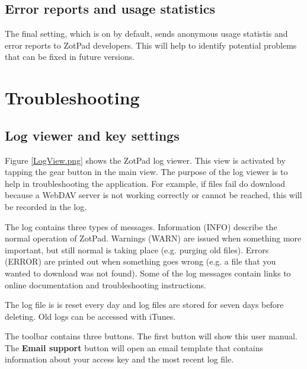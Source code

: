 \documentclass[oneside, openany, 12pt]{tufte-book}
\newcommand{\iphone}[1]{#1}
\newcommand{\ipad}[1]{}
\newcommand{\image}[2]{
	\center
	\fbox{\texttt{[image: images/iPhone/\{\#2]}}}

	\refstepcounter{figure}
	\smallskip\noindent\small Figure \thefigure: #1
	\label{#2}
	}
\newcommand{\iphone}[1]{}
\newcommand{\ipad}[1]{#1}
\newcommand{\image}[2]{
	\caption{#1}
	\label{#2}
	\fbox{\texttt{[image: images/iPad/\{\#2]}}}
	}
\begin{document}
\section{Error reports and usage statistics}

The final setting, which is on by default, sends anonymous usage statistis and error reports to ZotPad developers. This will help to identify potential problems that can be fixed in future versions.

\chapter{Troubleshooting}

\section{Log viewer and key settings}

Figure \ref{LogView.png} shows the ZotPad log viewer. This view is activated by tapping the gear button in the main view. The purpose of the log viewer is to help in troubleshooting the application. For example, if files fail do download because a WebDAV server is not working correctly or cannot be reached, this will be recorded in the log.

The log contains three types of messages. Information (INFO) describe the normal operation of ZotPad. Warnings (WARN) are issued when something more important, but still normal is taking place (e.g. purging old files). Errors (ERROR) are printed out when something goes wrong (e.g. a file that you wanted to download was not found). Some of the log messages contain links to online documentation and troubleshooting instructions.

The log file is is reset every day and log files are stored for seven days before deleting. Old logs can be accessed with iTunes. 

\begin{figure}
\image{ZotPad log viewer}{LogView.png}
\end{figure}

The toolbar contains \ipad{four}\iphone{three} buttons. The first button will show this user manual\ipad{ and the second button will open the support pages on the ZotPad website. These pages contain the most up to date documentation and are complementary to this user manual}. The \textbf{Email support} button will open an email template that contains information about your access key and the most recent log file.
\end{document}
